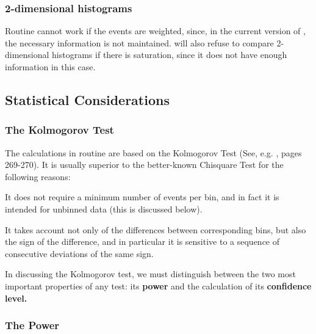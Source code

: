 \subsubsection*{2-dimensional histograms}
 
Routine  cannot work if the events are weighted,
since, in the current version of , the necessary information
is not maintained.
 will also refuse to compare 2-dimensional histograms if
there is saturation, since it does not have enough information
in this case.
 
\subsection{Statistical Considerations}
\label{HSTATCON}
 
\subsubsection*{The Kolmogorov Test}
 
The calculations in routine  are based on the Kolmogorov Test
(See, e.g. \cite{bib-EADIE}, pages 269-270).
It is usually superior to the better-known Chisquare Test
for the following reasons:
\begin{UL}
\item
It does not require a minimum number of events per bin,
and in fact it is intended for unbinned data (this is discussed
below).
\item
It takes account not only of the differences between corresponding
bins, but also the sign of the difference, and in particular it is
sensitive to a sequence of consecutive deviations of the same sign.
\end{UL}
\par In discussing the Kolmogorov test, we must distinguish
between the two most important properties of any test: its
{\bf power} and the calculation of its {\bf confidence level.}
 
\subsubsection*{The Power}
 
